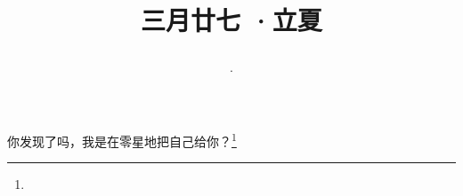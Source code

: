 \title{\date[d=5,m=5,y=2024][year:cn-y,年,month:cn,day:cn,日,·,weekday]·三月廿七 ·立夏}
你发现了吗，我是在零星地把自己给你？\footnote{ }

